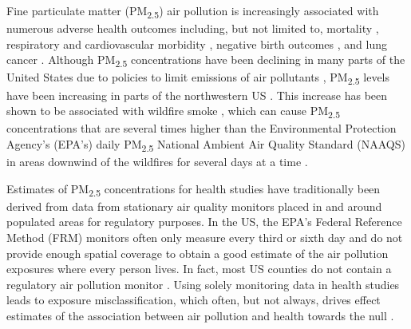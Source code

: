 \documentclass[english]{article}
\begin{document}

Fine particulate matter (PM\textsubscript{2.5}) air pollution is increasingly associated with numerous adverse health outcomes including, but not limited to, mortality \cite{achilleos_acute_2017}, respiratory and cardiovascular morbidity \cite{xing_impact_2016, rajagopalan_air_2018}, negative birth outcomes \cite{klepac_ambient_2018}, and lung cancer \cite{hamra_outdoor_2014}. Although PM\textsubscript{2.5} concentrations have been declining in many parts of the United States due to policies to limit emissions of air pollutants \cite{fann_estimated_2017}, PM\textsubscript{2.5} levels have been increasing in parts of the northwestern US \cite{mcclure_US_2018}. This increase has been shown to be associated with wildfire smoke \cite{mcclure_US_2018, ODell_contribution_2019}, which can cause PM\textsubscript{2.5} concentrations that are several times higher than the Environmental Protection Agency's (EPA’s) daily PM\textsubscript{2.5} National Ambient Air Quality Standard (NAAQS) in areas downwind of the wildfires for several days at a time \cite{reid_associations_2019}. 

Estimates of PM\textsubscript{2.5} concentrations for health studies have traditionally been derived from data from stationary air quality monitors placed in and around populated areas for regulatory purposes. In the US, the EPA’s Federal Reference Method (FRM) monitors often only measure every third or sixth day and do not provide enough spatial coverage to obtain a good estimate of the air pollution exposures where every person lives. In fact, most US counties do not contain a regulatory air pollution monitor \cite{brokamp_assessing_2019}. Using solely monitoring data in health studies leads to exposure misclassification, which often, but not always, drives effect estimates of the association between air pollution and health towards the null \cite{zeger_exposure_2000}.
\end{document}
